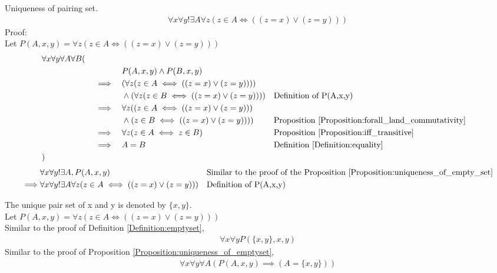 \begin{prop}
\label{Proposition:uniqueness_of_pairing_set}
Uniqueness of pairing set.
\begin{align*}
\forall x \forall y !\exists A \forall z (z \in A \iff ((z=x) \lor (z=y)))
\end{align*}
Proof: \\
Let $P(A,x,y) =  \forall z (z \in A \iff ((z=x) \lor (z=y)))$
\begin{align*}
& \forall x \forall y \forall A \forall B ( \\
& \quad && &&  P(A,x,y) \land P(B,x,y) \\
& \quad && \implies &&  (\forall z (z \in A \iff ((z=x) \lor (z=y)))) \\
& \quad && && \land      (\forall z (z \in B \iff ((z=x) \lor (z=y))))
&& \text{Definition of P(A,x,y)} \\
& \quad && \implies &&  \forall z ((z \in A \iff ((z=x) \lor (z=y))) \\
& \quad && && \land                    (z \in B \iff ((z=x) \lor (z=y))))
&& \text{Proposition \ref{Proposition:forall_land_commutativity}} \\
& \quad && \implies && \forall z (z \in A \iff z \in B)
&& \text{Proposition \ref{Proposition:iff_transitive}} \\
& \quad && \implies && A = B
&& \text{Definition \ref{Definition:equality}} \\
& )
\end{align*}
\begin{align*}
& \forall x \forall y !\exists A, P(A,x,y)
&& \text{Similar to the proof of the Proposition \ref{Proposition:uniqueness_of_empty_set}} \\
\implies & \forall x \forall y !\exists A \forall z (z \in A \iff ((z=x) \lor (z=y))) && \text{Definition of P(A,x,y)} \\
\end{align*}
\end{prop}

\begin{defn}
\label{Definition:pair_set}
The unique pair set of x and y is denoted by $\{ x,y \}$. \\
Let $P(A,x,y) =  \forall z (z \in A \iff ((z=x) \lor (z=y)))$ \\
Similar to the proof of Definition \ref{Definition:emptyset},
\begin{align*}
\forall x \forall y P(\{ x,y \} ,x,y)
\end{align*}
Similar to the proof of Proposition \ref{Proposition:uniqueness_of_emptyset},
\begin{align*}
\forall x \forall y \forall A (P(A,x,y) \implies (A=\{ x,y \}))
\end{align*}
\end{defn}

